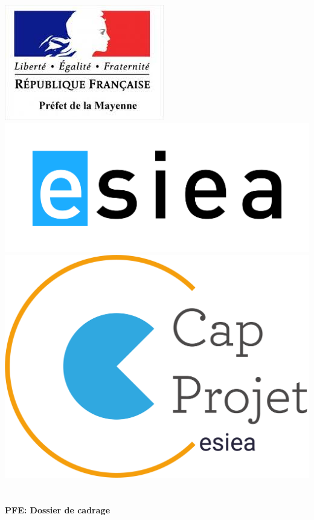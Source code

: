 \begin{titlepage}
\begin{center}

\includegraphics[scale=0.45] {images/logoPref.jpeg} \includegraphics[scale=0.35] {images/ESIEA.JPG} \includegraphics[scale=0.2] {images/capProjet.png}~\\[1.5cm] 

\textsc {\LARGE }\\[5cm]

{\LARGE \bfseries PFE\@: Dossier de cadrage\\[0.4cm] }


\end{center}
\end{titlepage}

